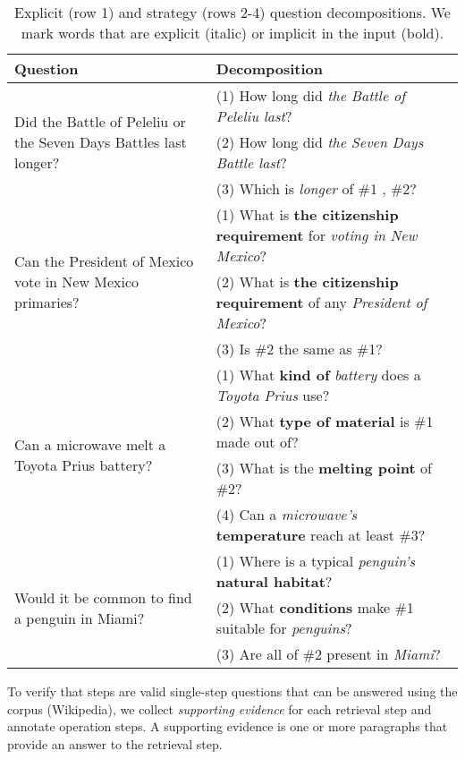 {\begin{table}[t]
    \centering
    \footnotesize
    {
    \begin{tabular}{p{1.9cm}|p{4.8cm}}
        Question & Decomposition \\ \toprule
         \multirow{3}{=}{Did the Battle of Peleliu or the Seven Days Battles last longer?} & (1) How long did \emph{the Battle of Peleliu last}? \\
         & (2) How long did \emph{the Seven Days Battle last}? \\
         & (3) Which is \emph{longer} of \#1 , \#2? \\ \midrule \midrule 
         \multirow{3}{=}{Can the President of Mexico vote in New Mexico primaries?} & (1) What is \textbf{the citizenship requirement} for \emph{voting in} \emph{New Mexico}? \\
         & (2) What is \textbf{the citizenship requirement} of any \emph{President of Mexico}? \\
         & (3) Is \#2 the same as \#1?  \\ \midrule
         \multirow{4}{=}{Can a microwave melt a Toyota Prius battery?} & (1) What \textbf{kind of} \emph{battery} does a \emph{Toyota Prius} use? \\
         & (2) What \textbf{type of material} is \#1 made out of? \\
         & (3) What is the \textbf{melting point} of \#2?  \\
         & (4) Can a \emph{microwave's} \textbf{temperature} reach at least \#3?    \\ \midrule
        \multirow{3}{=}{Would it be common to find a penguin in Miami?} & (1) Where is a typical \emph{penguin's} \textbf{natural habitat}? \\
         & (2) What \textbf{conditions} make \#1 suitable for \emph{penguins}? \\
         & (3) Are all of \#2 present in \emph{Miami}?
    \end{tabular}
    }
    \caption{Explicit (row 1) and strategy (rows 2-4) question decompositions. We mark words that are explicit (italic) or implicit in the input (bold).
    }
    \label{table:decomposition_examples}
\end{table}

To verify that steps are valid single-step questions that can be answered using the corpus (Wikipedia), we collect
\textit{supporting evidence} for each retrieval step and annotate operation steps.
A supporting evidence is one or more paragraphs that provide an answer to the retrieval step. 

}
